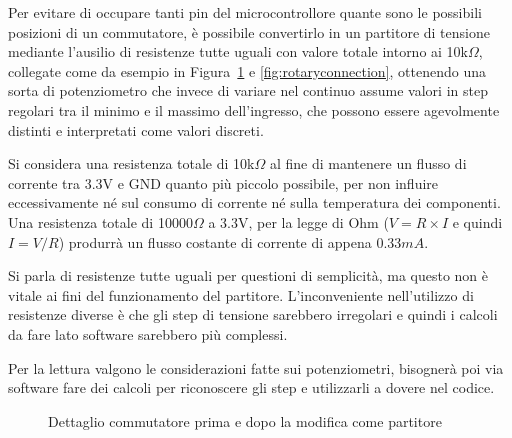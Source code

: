 \documentclass[12pt,a4paper]{report}
\begin{document}
Per evitare di occupare tanti pin del microcontrollore quante sono le possibili posizioni di un commutatore, è possibile convertirlo in un
partitore di tensione mediante l'ausilio di resistenze tutte uguali con valore totale intorno ai 10k$\Omega$,
collegate come da esempio in Figura~\ref{fig:commutatoreprimadopo} e \ref{fig:rotaryconnection},
ottenendo una sorta di potenziometro che invece di variare nel continuo assume valori in step regolari tra il minimo e il massimo
dell'ingresso, che possono essere agevolmente distinti e interpretati come valori discreti.

Si considera una resistenza totale di 10k$\Omega$ al fine di mantenere un flusso di corrente tra 3.3V e GND
quanto più piccolo possibile, per non influire eccessivamente né sul consumo di corrente né sulla temperatura dei componenti.
Una resistenza totale di 10000$\Omega$ a 3.3V, per la legge di Ohm ($V = R \times I$ e quindi $I = V / R$) produrrà un flusso
costante di corrente di appena 0.33$mA$.

Si parla di resistenze tutte uguali per questioni di semplicità, ma questo non è vitale ai fini del funzionamento del partitore.
L'inconveniente nell'utilizzo di resistenze diverse è che gli step di tensione sarebbero irregolari e quindi i calcoli da fare lato software
sarebbero più complessi.

Per la lettura valgono le considerazioni fatte sui potenziometri, bisognerà
poi via software fare dei calcoli per riconoscere gli step e utilizzarli a dovere nel codice.

\begin{figure}[h]
  \centering
  \enspace
  \caption{Dettaglio commutatore prima e dopo la modifica come partitore}
  \label{fig:commutatoreprimadopo}
\end{figure}
\end{document}
